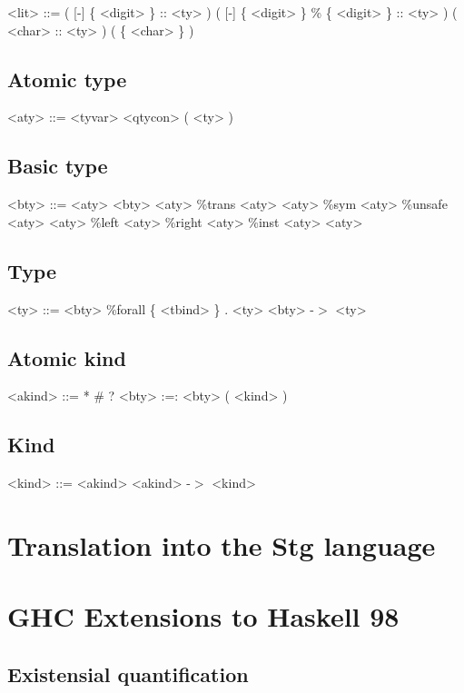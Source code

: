 \begin{grammar}
<lit> ::= ( [-] \{ <digit> \} :: <ty> )
     \alt ( [-] \{ <digit> \} \% \{ <digit> \} :: <ty> )
     \alt ( <char> :: <ty> )
     \alt ( \{ <char> \} )
\end{grammar}

\subsection{Atomic type}

\begin{grammar}
<aty> ::= <tyvar>
     \alt <qtycon>
     \alt ( <ty> )
\end{grammar}

\subsection{Basic type}

\begin{grammar}
<bty> ::= <aty>
     \alt <bty> <aty>
     \alt \%trans <aty> <aty>
     \alt \%sym <aty>
     \alt \%unsafe <aty> <aty>
     \alt \%left <aty>
     \alt \%right <aty>
     \alt \%inst <aty> <aty>
\end{grammar}

\subsection{Type}

\begin{grammar}
<ty> ::= <bty>
    \alt \%forall \{ <tbind> \} . <ty>
    \alt <bty> -$>$ <ty>
\end{grammar}

\subsection{Atomic kind}

\begin{grammar}
<akind> ::= *
       \alt \#
       \alt ?
       \alt <bty> :=: <bty>
       \alt ( <kind> )
\end{grammar}

\subsection{Kind}

\begin{grammar}
<kind> ::= <akind>
      \alt <akind> -$>$ <kind>
\end{grammar}





\section{Translation into the Stg language}



\section{GHC Extensions to Haskell 98}

\subsection{Existensial quantification}
